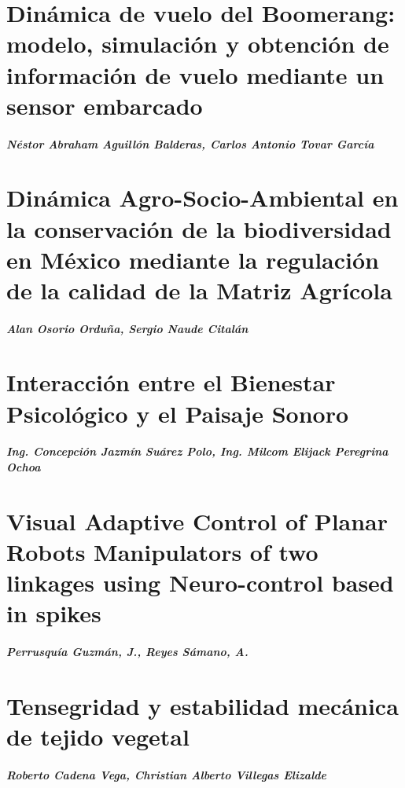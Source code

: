     \chapter{Dinámica de vuelo del Boomerang: modelo, simulación y obtención de información de vuelo mediante un sensor embarcado}
    \paragraph{Néstor Abraham Aguillón Balderas, Carlos Antonio Tovar García}
    

    \chapter{Dinámica Agro-Socio-Ambiental en la conservación de la biodiversidad en México mediante la regulación de la calidad de la Matriz Agrícola}
    \paragraph{Alan Osorio Orduña, Sergio Naude Citalán}
    

    \chapter{Interacción entre el Bienestar Psicológico y el Paisaje Sonoro}
    \paragraph{Ing. Concepción Jazmín Suárez Polo, Ing. Milcom Elijack Peregrina Ochoa}
    

    \chapter{Visual Adaptive Control of Planar Robots Manipulators of two linkages using Neuro-control based in spikes}
    \paragraph{Perrusqu\'ia Guzm\'an, J., Reyes S\'amano, A.}
    

    \chapter{Tensegridad y estabilidad mecánica de tejido vegetal}
    \paragraph{Roberto Cadena Vega, Christian Alberto Villegas Elizalde}



